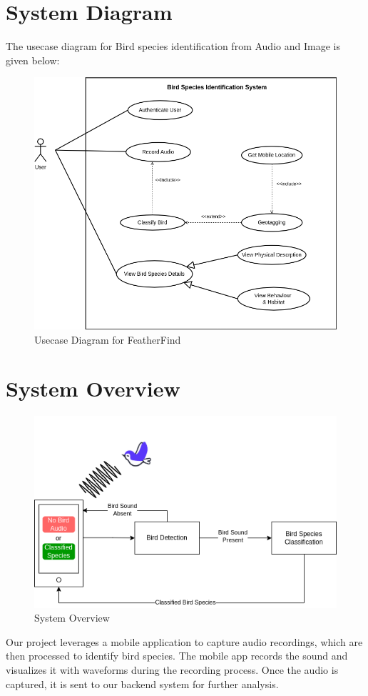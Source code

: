 \section{System Diagram}
The usecase diagram for Bird species identification from Audio and Image is
given below:
\begin{figure}[h!]
    \centering
    \includegraphics[scale=0.5]{images/usecase.png}
    \caption{Usecase Diagram for
        FeatherFind}%
\end{figure}

\section{System Overview}
\begin{figure}[h!]
    \centering
    \includegraphics[scale=0.65]{images/System Overview.png}
    \caption{System Overview}\label{fig:system_overview}
\end{figure}
Our project leverages a mobile application to capture audio recordings, which
are then processed to identify bird species. The mobile app records the sound
and visualizes it with waveforms during the recording process. Once the audio
is captured, it is sent to our backend system for further analysis.

